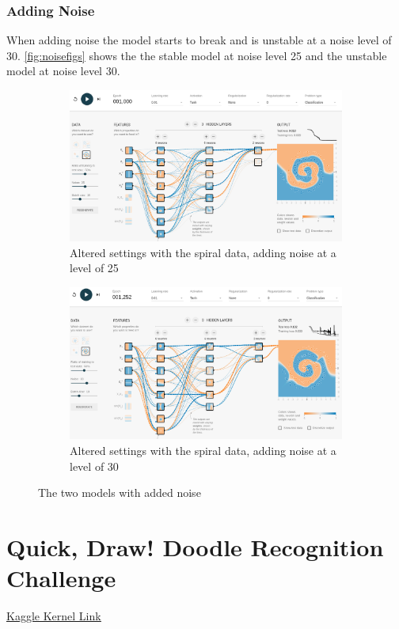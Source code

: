 \documentclass{article}
\begin{document}
\subsubsection{Adding Noise}
When adding noise the model starts to break and is unstable at a noise level of 30. \autoref{fig:noisefigs} shows the the stable model at noise level 25 and the unstable model at noise level 30.

\begin{figure}[h]
  \centering
  \begin{subfigure}[b]{0.48\textwidth}
    \includegraphics[width=\textwidth]{altered_noise_25}
    \caption{Altered settings with the spiral data, adding noise at a level of 25}
    \label{fig:alt_noise_25}
  \end{subfigure}
  \hfill
  \begin{subfigure}[b]{0.48\textwidth}
    \includegraphics[width=\textwidth]{altered_noise_30}
    \caption{Altered settings with the spiral data, adding noise at a level of 30}
    \label{fig:alt_noise_30}
  \end{subfigure}
  \caption{The two models with added noise}
  \label{fig:noisefigs}
\end{figure}

\section{Quick, Draw! Doodle Recognition Challenge}
\underline{\href{https://www.kaggle.com/nicstar92/quick-draw-doodle-recognition-challenge}{Kaggle Kernel Link}}
\end{document}

